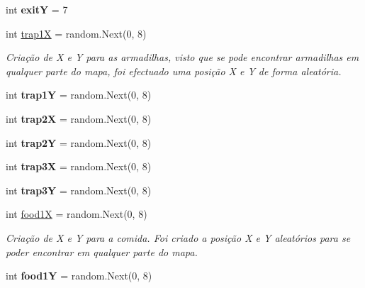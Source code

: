 \begin{DoxyCompactItemize}
int {\bfseries exitY} = 7
\item 
int \mbox{\hyperlink{class_projeto2___l_p1_1_1_grid_a0734840445dd0b3453df5339e4f9bc4a}{trap1X}} = random.\+Next(0, 8)
\begin{DoxyCompactList}\small\item\em Criação de X e Y para as armadilhas, visto que se pode encontrar armadilhas em qualquer parte do mapa, foi efectuado uma posição X e Y de forma aleatória. \end{DoxyCompactList}\item 
\mbox{\label{class_projeto2___l_p1_1_1_grid_adadcab0ba8152b9339f776a308419dc4}} 
int {\bfseries trap1Y} = random.\+Next(0, 8)
\item 
\mbox{\label{class_projeto2___l_p1_1_1_grid_a7e428b08d00b94c954bf3a58ba5997b3}} 
int {\bfseries trap2X} = random.\+Next(0, 8)
\item 
\mbox{\label{class_projeto2___l_p1_1_1_grid_ad50cbe31417edf011367dfd73ea083e0}} 
int {\bfseries trap2Y} = random.\+Next(0, 8)
\item 
\mbox{\label{class_projeto2___l_p1_1_1_grid_ae4f1ded723499be32e1241e44a712dd1}} 
int {\bfseries trap3X} = random.\+Next(0, 8)
\item 
\mbox{\label{class_projeto2___l_p1_1_1_grid_a306d418e3191db76ecd882d361b3e188}} 
int {\bfseries trap3Y} = random.\+Next(0, 8)
\item 
int \mbox{\hyperlink{class_projeto2___l_p1_1_1_grid_aa058efe324b104363e8e062c670f2261}{food1X}} = random.\+Next(0, 8)
\begin{DoxyCompactList}\small\item\em Criação de X e Y para a comida. Foi criado a posição X e Y aleatórios para se poder encontrar em qualquer parte do mapa. \end{DoxyCompactList}\item 
\mbox{\label{class_projeto2___l_p1_1_1_grid_a5afe4eb412b3942c44eb344ae5ef21d1}} 
int {\bfseries food1Y} = random.\+Next(0, 8)
\item 
\mbox{\label{class_projeto2___l_p1_1_1_grid_aef4bd423ad92491e986442674bbf3b08}} 

\end{DoxyCompactItemize}
